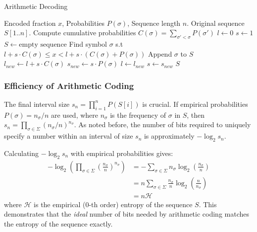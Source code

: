 \begin{algorithm}[hbtp]
    \caption{Arithmetic Decoding} \label{alg:arithmetic_decoding}
    \small
    \begin{algorithmic}[1]
        \Require Encoded fraction $x$, Probabilities $P(\sigma)$, Sequence length $n$.
        \Ensure Original sequence $S[1..n]$.
        \State Compute cumulative probabilities $C(\sigma) = \sum_{\sigma' < \sigma} P(\sigma')$
        \State $l \gets 0$
        \State $s \gets 1$
        \State $S \gets \text{empty sequence}$
        \State Find symbol $\sigma$ s.t $l+s \cdot C(\sigma) \le x < l+s \cdot (C(\sigma)+P(\sigma))$
        \State Append $\sigma$ to $S$
        \State $l_{new} \gets l + s \cdot C(\sigma)$
        \State $s_{new} \gets s \cdot P(\sigma)$
        \State $l \gets l_{new}$
        \State $s \gets s_{new}$
        \EndFor
        \State \Return $S$
    \end{algorithmic}
\end{algorithm}

\subsubsection{Efficiency of Arithmetic Coding}
The final interval size $s_n = \prod_{i=1}^n P(S[i])$ is crucial. If empirical probabilities $P(\sigma) = n_\sigma / n$ are used, where $n_\sigma$ is the frequency of $\sigma$ in $S$, then $s_n = \prod_{\sigma \in \Sigma} (n_\sigma / n)^{n_\sigma}$. As noted before, the number of bits required to uniquely specify a number within an interval of size $s_n$ is approximately $-\log_2 s_n$.

Calculating $-\log_2 s_n$ with empirical probabilities gives:
\begin{align*}
    -\log_2 \left( \prod_{\sigma \in \Sigma} \left(\frac{n_\sigma}{n}\right)^{n_\sigma} \right) & = -\sum_{\sigma \in \Sigma} n_\sigma \log_2 \left(\frac{n_\sigma}{n}\right)            \\
                                                                                                & = n \sum_{\sigma \in \Sigma} \frac{n_\sigma}{n} \log_2 \left(\frac{n}{n_\sigma}\right) \\
                                                                                                & = n\mathcal{H}
\end{align*}
where $\mathcal{H}$ is the empirical (0-th order) entropy of the sequence $S$. This demonstrates that the \emph{ideal} number of bits needed by arithmetic coding matches the entropy of the sequence exactly.

